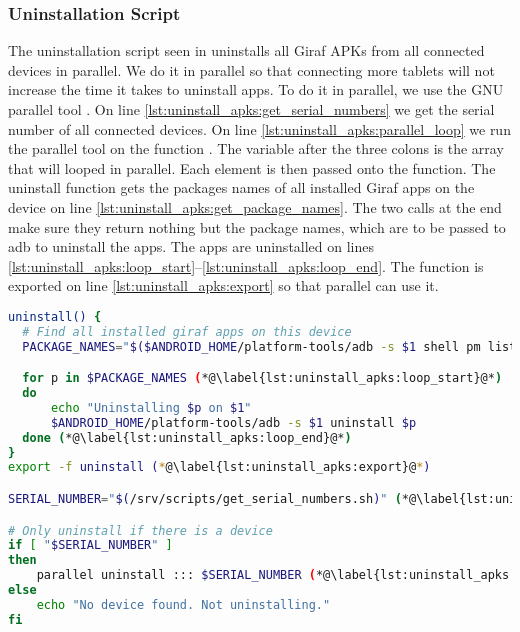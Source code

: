 \subsubsection{Uninstallation Script}
 The uninstallation script seen in  uninstalls all Giraf APKs from all connected devices in parallel. We do it in parallel so that connecting more tablets will not increase the time it takes to uninstall apps. To do it in parallel, we use the GNU parallel tool \parencite{Tange2011a}. On line \ref{lst:uninstall_apks:get_serial_numbers} we get the serial number of all connected devices. On line \ref{lst:uninstall_apks:parallel_loop} we run the parallel tool on the function . The variable  after the three colons is the array that will looped in parallel. Each element is then passed onto the  function. The uninstall function gets the packages names of all installed Giraf apps on the device on line \ref{lst:uninstall_apks:get_package_names}. The two  calls at the end make sure they return nothing but the package names, which are to be passed to adb to uninstall the apps. The apps are uninstalled on lines \ref{lst:uninstall_apks:loop_start}--\ref{lst:uninstall_apks:loop_end}. The function is exported on line \ref{lst:uninstall_apks:export} so that parallel can use it.
\begin{lstlisting}[language=bash,caption=Script that uninstalls all installed Giraf apps on all devices,label=lst:uninstall_apks]
uninstall() {
  # Find all installed giraf apps on this device
  PACKAGE_NAMES="$($ANDROID_HOME/platform-tools/adb -s $1 shell pm list packages -f | grep dk.aau.cs.giraf | sed 's/.*apk=//' | sed 's/\s*//g')" (*@\label{lst:uninstall_apks:get_package_names}@*)

  for p in $PACKAGE_NAMES (*@\label{lst:uninstall_apks:loop_start}@*)
  do
      echo "Uninstalling $p on $1"
      $ANDROID_HOME/platform-tools/adb -s $1 uninstall $p
  done (*@\label{lst:uninstall_apks:loop_end}@*)
}
export -f uninstall (*@\label{lst:uninstall_apks:export}@*)

SERIAL_NUMBER="$(/srv/scripts/get_serial_numbers.sh)" (*@\label{lst:uninstall_apks:get_serial_numbers}@*)

# Only uninstall if there is a device
if [ "$SERIAL_NUMBER" ]
then
    parallel uninstall ::: $SERIAL_NUMBER (*@\label{lst:uninstall_apks:parallel_loop}@*)
else
    echo "No device found. Not uninstalling."
fi
\end{lstlisting}

